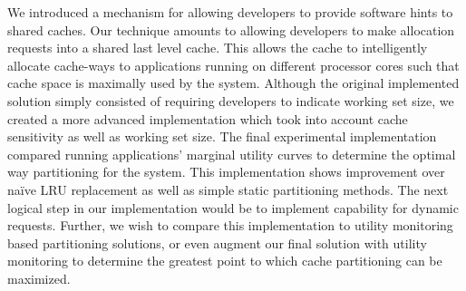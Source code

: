 \documentclass{acm_proc_article-sp}
\begin{document}
We introduced a mechanism for allowing developers to provide software hints to shared caches. Our technique amounts to allowing developers to make allocation requests into a shared last level cache. This allows the cache to intelligently allocate cache-ways to applications running on different processor cores such that cache space is maximally used by the system. Although the original implemented solution simply consisted of requiring developers to indicate working set size, we created a more advanced implementation which took into account cache sensitivity as well as working set size. The final experimental implementation compared running applications’ marginal utility curves to determine the optimal way partitioning for the system. This implementation shows improvement over naïve LRU replacement as well as simple static partitioning methods. The next logical step in our implementation would be to implement capability for dynamic requests. Further, we wish to compare this implementation to utility monitoring based partitioning solutions, or even augment our final solution with utility monitoring to determine the greatest point to which cache partitioning can be maximized.




\end{document}

